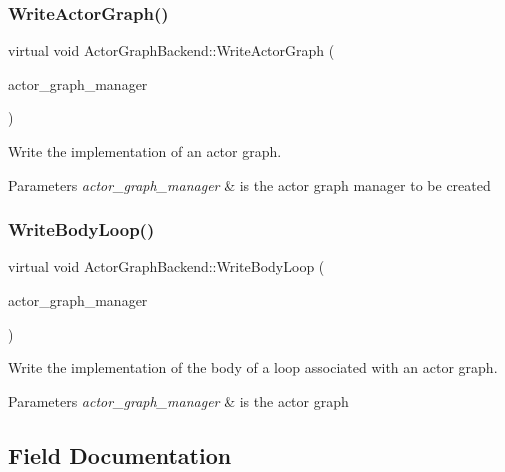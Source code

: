 \subsubsection{\texorpdfstring{Write\+Actor\+Graph()}{WriteActorGraph()}}
{\footnotesize\ttfamily virtual void Actor\+Graph\+Backend\+::\+Write\+Actor\+Graph (\begin{DoxyParamCaption}\item[{const Actor\+Graph\+Manager\+Const\+Ref}]{actor\+\_\+graph\+\_\+manager }\end{DoxyParamCaption})\hspace{0.3cm}{\ttfamily [pure virtual]}}



Write the implementation of an actor graph. 


\begin{DoxyParams}{Parameters}
{\em actor\+\_\+graph\+\_\+manager} & is the actor graph manager to be created \\
\hline
\end{DoxyParams}
\mbox{\label{classActorGraphBackend_af0f218afe9f031f313adfe35c1faa08e}} 
\subsubsection{\texorpdfstring{Write\+Body\+Loop()}{WriteBodyLoop()}}
{\footnotesize\ttfamily virtual void Actor\+Graph\+Backend\+::\+Write\+Body\+Loop (\begin{DoxyParamCaption}\item[{const Actor\+Graph\+Manager\+Const\+Ref}]{actor\+\_\+graph\+\_\+manager }\end{DoxyParamCaption})\hspace{0.3cm}{\ttfamily [pure virtual]}}



Write the implementation of the body of a loop associated with an actor graph. 


\begin{DoxyParams}{Parameters}
{\em actor\+\_\+graph\+\_\+manager} & is the actor graph \\
\hline
\end{DoxyParams}


\subsection{Field Documentation}
\mbox{\label{classActorGraphBackend_a8b2c70ac1d05962bd8ef3938ff0b5245}} 
